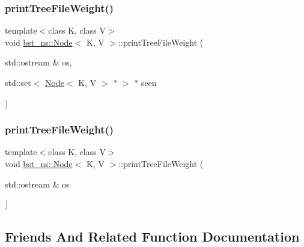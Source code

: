 \subsubsection{\texorpdfstring{print\+Tree\+File\+Weight()}{printTreeFileWeight()}\hspace{0.1cm}{\footnotesize\ttfamily [1/2]}}
{\footnotesize\ttfamily template$<$class K, class V$>$ \\
void \hyperlink{classbst__ns_1_1Node}{bst\+\_\+ns\+::\+Node}$<$ K, V $>$\+::print\+Tree\+File\+Weight (\begin{DoxyParamCaption}\item[{std\+::ostream \&}]{os,  }\item[{std\+::set$<$ \hyperlink{classbst__ns_1_1Node}{Node}$<$ K, V $>$ $\ast$ $>$ $\ast$}]{seen }\end{DoxyParamCaption})\hspace{0.3cm}{\ttfamily [inline]}}

\mbox{\label{classbst__ns_1_1Node_a31543e58fb925b71c03aa2780735d737}} 
\subsubsection{\texorpdfstring{print\+Tree\+File\+Weight()}{printTreeFileWeight()}\hspace{0.1cm}{\footnotesize\ttfamily [2/2]}}
{\footnotesize\ttfamily template$<$class K, class V$>$ \\
void \hyperlink{classbst__ns_1_1Node}{bst\+\_\+ns\+::\+Node}$<$ K, V $>$\+::print\+Tree\+File\+Weight (\begin{DoxyParamCaption}\item[{std\+::ostream \&}]{os }\end{DoxyParamCaption})\hspace{0.3cm}{\ttfamily [inline]}}



\subsection{Friends And Related Function Documentation}
\mbox{\label{classbst__ns_1_1Node_a868b7fcd3b0bb864d505f6206b592dce}} 
